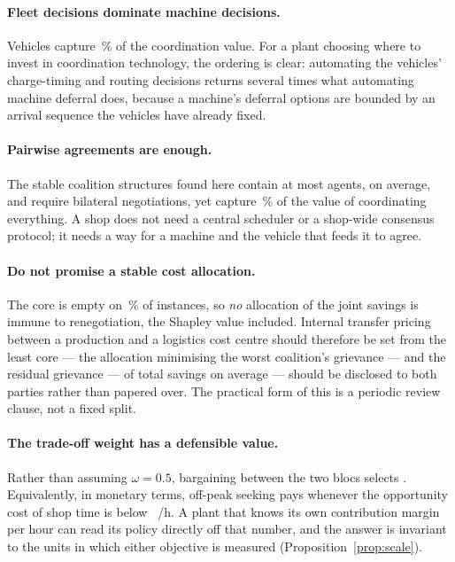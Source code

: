 \documentclass[preprint, 3p, review, 12pt]{elsarticle}
\providecommand{\euro}{\texteuro}
\theoremstyle{definition}
\begin{document}
\paragraph{Fleet decisions dominate machine decisions.}
Vehicles capture \,\% of the coordination value. For a plant
choosing where to invest in coordination technology, the ordering is clear: automating the
vehicles' charge-timing and routing decisions returns several times what automating machine
deferral does, because a machine's deferral options are bounded by an arrival sequence the
vehicles have already fixed.

\paragraph{Pairwise agreements are enough.}
The stable coalition structures found here contain at most
 agents,  on average, and require
 bilateral negotiations, yet
capture \,\% of the value of coordinating everything. A shop does
not need a central scheduler or a shop-wide consensus protocol; it needs a way for a machine
and the vehicle that feeds it to agree.

\paragraph{Do not promise a stable cost allocation.}
The core is empty on \,\% of instances, so \emph{no} allocation of
the joint savings is immune to renegotiation, the Shapley value included. Internal transfer
pricing between a production and a logistics cost centre should therefore be set from the
least core --- the allocation minimising the worst coalition's grievance --- and the residual
grievance ---  of total savings on average --- should be
disclosed to both parties
rather than papered over. The practical form of this is a periodic review clause, not a fixed
split.

\paragraph{The trade-off weight has a defensible value.}
Rather than assuming $\omega=0.5$, bargaining between the two blocs selects
. Equivalently, in monetary terms, off-peak seeking pays whenever the
opportunity cost of shop time is below ~\euro/h. A plant that
knows its own contribution margin per hour can read its policy directly off that number, and
the answer is invariant to the units in which either objective is measured
(Proposition~\ref{prop:scale}).
\end{document}
